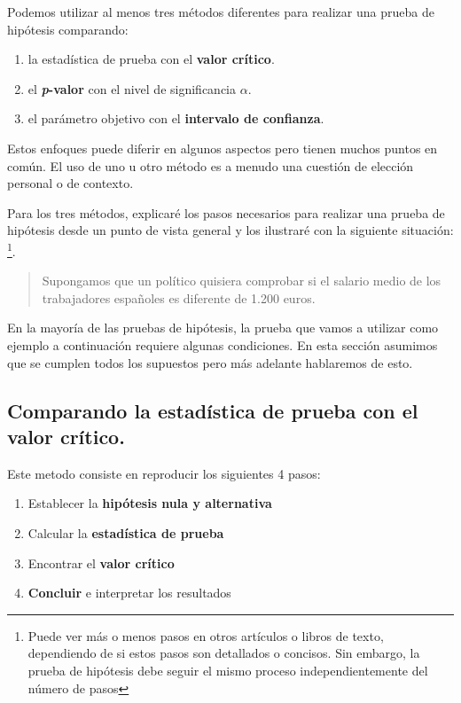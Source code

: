 \documentclass[
]{book}
\providecommand{\tightlist}{%
  \setlength{\itemsep}{0pt}\setlength{\parskip}{0pt}}
\begin{document}
Podemos utilizar al menos tres métodos diferentes para realizar una prueba de hipótesis comparando:

\begin{enumerate}
\def\labelenumi{\arabic{enumi}.}
\tightlist
\item
  la estadística de prueba con el \textbf{valor crítico}.
\item
  el \textbf{\emph{p}-valor} con el nivel de significancia \(\alpha\).
\item
  el parámetro objetivo con el \textbf{intervalo de confianza}.
\end{enumerate}

Estos enfoques puede diferir en algunos aspectos pero tienen muchos puntos en común. El uso de uno u otro método es a menudo una cuestión de elección personal o de contexto.

Para los tres métodos, explicaré los pasos necesarios para realizar una prueba de hipótesis desde un punto de vista general y los ilustraré con la siguiente situación: \footnote{Puede ver más o menos pasos en otros artículos o libros de texto, dependiendo de si estos pasos son detallados o concisos. Sin embargo, la prueba de hipótesis debe seguir el mismo proceso independientemente del número de pasos}.

\begin{quote}
Supongamos que un político quisiera comprobar si el salario medio de los trabajadores españoles es diferente de 1.200 euros.
\end{quote}

En la mayoría de las pruebas de hipótesis, la prueba que vamos a utilizar como ejemplo a continuación requiere algunas condiciones. En esta sección asumimos que se cumplen todos los supuestos pero más adelante hablaremos de esto.

\hypertarget{comparando-la-estaduxedstica-de-prueba-con-el-valor-cruxedtico.}{%
\subsection{\texorpdfstring{Comparando la estadística de prueba con el \textbf{valor crítico}.}{Comparando la estadística de prueba con el valor crítico.}}\label{comparando-la-estaduxedstica-de-prueba-con-el-valor-cruxedtico.}}

Este metodo consiste en reproducir los siguientes 4 pasos:

\begin{enumerate}
\def\labelenumi{\arabic{enumi}.}
\tightlist
\item
  Establecer la \textbf{hipótesis nula y alternativa}
\item
  Calcular la \textbf{estadística de prueba}
\item
  Encontrar el \textbf{valor crítico}
\item
  \textbf{Concluir} e interpretar los resultados
\end{enumerate}
\end{document}
